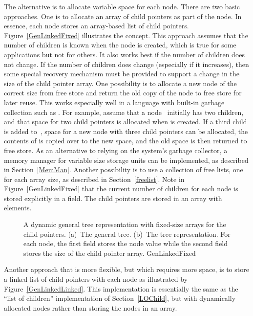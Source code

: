 The alternative is to allocate variable space for each node.
There are two basic approaches.
One is to allocate an array of child pointers as part of the node.
In essence, each node stores an array-based list of child pointers.
Figure~\ref{GenLinkedFixed} illustrates the concept.
This approach assumes that the number of children is known when the
node is created, which is true for some applications but not for
others.
It also works best if the number of children does not change.
If the number of children does change (especially if it increases),
then some special recovery mechanism must be provided to support
a change in the size of the child pointer array.
One possibility is to allocate a new node of the correct size from
free store and return the old copy of the node to free store for
later reuse.
This works especially well in a language with built-in garbage
collection such as \LangJava.
For example, assume that a node~ initially has two children,
and that space for two child pointers is allocated when  is
created.
If a third child is added to~, space for a new node with three
child pointers can be allocated, the contents of  is copied
over to the new space, and the old space is then returned to free
store.
As an alternative to relying on the system's garbage collector,
a memory manager for variable size storage units can be implemented,
as described in Section~\ref{MemMan}.
Another possibility is to use a collection of free lists, one for each
array size, as described in Section~\ref{freelist}.
Note in Figure~\ref{GenLinkedFixed} that the current number of
children for each node is stored explicitly in a  field.
The child pointers are stored in an array with  elements.

\begin{figure}
\vspace{-\medskipamount}

{A dynamic general tree representation with fixed-size arrays for the
child pointers.
(a)~The general tree.
(b)~The tree representation.
For each node, the first field stores the node value while the second
field stores the size of the child pointer array.}
{GenLinkedFixed}
\medskip
\end{figure}

Another approach that is more flexible, but which requires more space, 
is to store a linked list of child pointers with each node
as illustrated by Figure~\ref{GenLinkedLinked}.
This implementation is essentially the same as the ``list of
children'' implementation of Section~\ref{LOChild}, but with
dynamically allocated nodes rather than storing the nodes in an
array.

